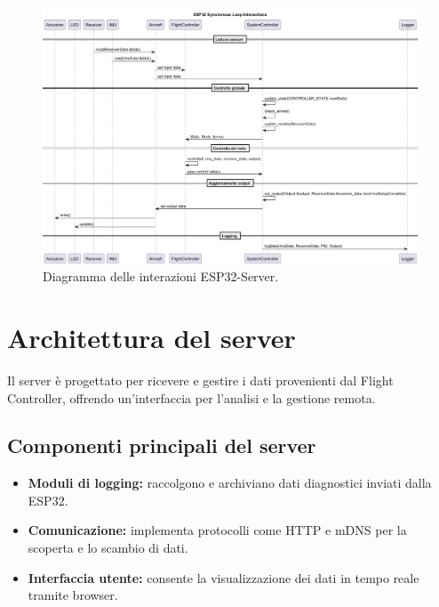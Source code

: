 \begin{figure}[h!]
    \centering
    \includegraphics[width=\textwidth]{diagrams/esp32_interactions.png}
    \caption{Diagramma delle interazioni ESP32-Server.}
    \label{fig:esp32_interactions}
\end{figure}


\section{Architettura del server}
Il server è progettato per ricevere e gestire i dati provenienti dal Flight Controller, offrendo un'interfaccia per l'analisi e la gestione remota.

\subsection{Componenti principali del server}
\begin{itemize}
\item \textbf{Moduli di logging:} raccolgono e archiviano dati diagnostici inviati dalla ESP32.
\item \textbf{Comunicazione:} implementa protocolli come HTTP e mDNS per la scoperta e lo scambio di dati.
\item \textbf{Interfaccia utente:} consente la visualizzazione dei dati in tempo reale tramite browser.
\end{itemize}

